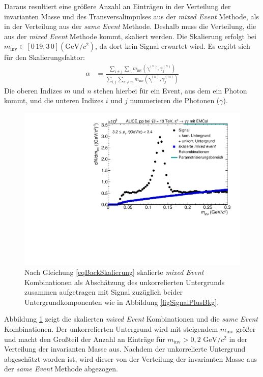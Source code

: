 Daraus resultiert eine größere Anzahl an Einträgen in der Verteilung der invarianten Masse und des Transversalimpulses aus der \textit{mixed Event} Methode, als in der Verteilung aus der \textit{same Event} Methode.
Deshalb muss die Verteilung, die aus der \textit{mixed Event} Methode kommt, skaliert werden.
Die Skalierung erfolgt bei $m_\text{inv} \in \left[0\,19,3\,0\right] (\text{GeV/}c^{2})$, da dort kein Signal erwartet wird.
Es ergibt sich für den Skalierungsfaktor:
\begin{align}
\label{eqBackSkalierung}
\alpha &= \frac{\sum_{i \neq j}\sum_{n}m_{\text{inv}}\left( \gamma^{(n)}_{i},\gamma^{(n)}_{j}\right) }{\sum_{i,j}\sum_{n \neq m}m_{\text{inv}}\left( \gamma^{(n)}_{i},\gamma^{(m)}_{j}\right) }
\end{align}
Die oberen Indizes $m$ und $n$ stehen hierbei für ein Event, aus dem ein Photon kommt, und die unteren Indizes $i$ und $j$ nummerieren die Photonen ($\gamma$).
\begin{figure}[tp]
\centering
\includegraphics[width=.75\linewidth]{hUncorrBkgNorm.pdf}
\caption{Nach Gleichung \ref{eqBackSkalierung} skalierte {\it mixed Event} Kombinationen als Abschätzung des unkorrelierten Untergrunds zusammen aufgetragen mit Signal zuzüglich beider Untergrundkomponenten wie in Abbildung \ref{figSignalPlusBkg}.}
\label{figUncorrBkgNorm}
\end{figure}
\newline
Abbildung \ref{figUncorrBkgNorm} zeigt die skalierten \textit{mixed Event} Kombinationen und die \textit{same Event} Kombinationen.
Der unkorrelierten Untergrund wird mit steigendem $m_\text{inv}$ größer und macht den Großteil der Anzahl an Einträge für $m_\text{inv} > 0,2 \text{ GeV/}c^{2}$ in der Verteilung der invarianten Masse aus. 
Nachdem der unkorrelierte Untergrund abgeschätzt worden ist, wird dieser von der Verteilung der invarianten Masse aus der \textit{same Event} Methode abgezogen.
